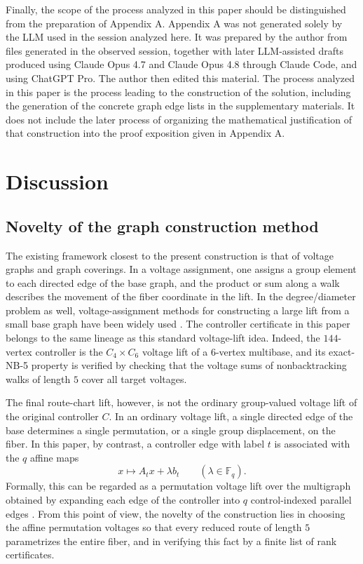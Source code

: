 \documentclass[11pt]{article}
\theoremstyle{definition}
\theoremstyle{remark}
\renewcommand{\_}{\textunderscore\allowbreak}
\begin{document}
Finally, the scope of the process analyzed in this paper should be
distinguished from the preparation of Appendix A. Appendix A was not
generated solely by the LLM used in the session analyzed here. It was prepared by the author from files generated in the observed
session, together with later LLM-assisted drafts produced using Claude
Opus 4.7 and Claude Opus 4.8 through Claude Code, and using ChatGPT Pro.
The author then edited this material. The process analyzed in this paper is the process leading to the
construction of the solution, including the generation of the concrete
graph edge lists in the supplementary materials. It does not
include the later process of organizing the mathematical justification
of that construction into the proof exposition given in Appendix A.


\section{Discussion}\label{discussion}

\subsection{Novelty of the graph construction
method}\label{novelty-of-the-graph-construction-method}

The existing framework closest to the present construction is that of
voltage graphs and graph coverings. In a voltage assignment, one assigns
a group element to each directed edge of the base graph, and the product
or sum along a walk describes the movement of the fiber coordinate in
the lift. In the degree/diameter problem as well, voltage-assignment
methods for constructing a large lift from a small base graph have been
widely used \cite{BrankovicEtAl1998a, LozSiran2008}. The controller
certificate in this paper belongs to the same lineage as this standard
voltage-lift idea. Indeed, the \(144\)-vertex controller is the
\(C_4\times C_6\) voltage lift of a \(6\)-vertex multibase, and its
exact-NB-5 property is verified by checking that the voltage sums of
nonbacktracking walks of length \(5\) cover all target voltages.

The final route-chart lift, however, is not the ordinary group-valued
voltage lift of the original controller \(C\). In an ordinary voltage
lift, a single directed edge of the base determines a single
permutation, or a single group displacement, on the fiber. In this
paper, by contrast, a controller edge with label \(t\) is associated
with the \(q\) affine maps \[
  x\mapsto A_t x+\lambda b_t\qquad(\lambda\in\mathbb F_q).
\] Formally, this can be regarded as a permutation voltage lift over the
multigraph obtained by expanding each edge of the controller into \(q\)
control-indexed parallel edges \cite{GrossTucker2001, DalfoEtAl2021}.
From this point of view, the novelty of the construction lies in
choosing the affine permutation voltages so that every reduced route of
length \(5\) parametrizes the entire fiber, and in verifying this fact
by a finite list of rank certificates.
\end{document}
